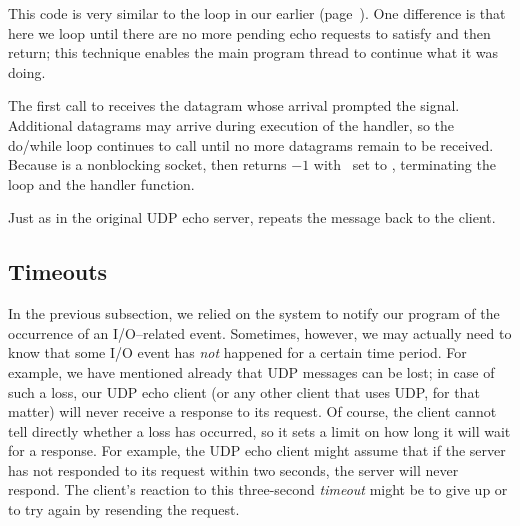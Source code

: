\begin{topcode}



This code is very similar to the loop in our earlier
 (page~\pageref{code/UDPEchoServer.c}).  One difference
is that here we loop
until there are no more pending echo requests to satisfy and then
return; this technique enables the main program thread to continue what it was
doing. 

\begin{bottomcode}


The first call to  receives the datagram
whose arrival
prompted the  signal.  Additional datagrams
may arrive during execution of the handler,
so the do/while loop continues to call 
until no more datagrams remain to be received.
Because  is a nonblocking socket,
 then returns $-1$ with \ set to
, terminating the loop and the handler
function.


Just as in the original UDP echo server, 
repeats the message back to the client.

\end{bottomcode}

\end{topcode}

\subsection{Timeouts}
\label{sect:timeouts}%

\noindent In the previous subsection, we relied on the system to notify our
program of the occurrence of an I/O--related event.
Sometimes, however, we may actually need to know that some I/O event
has \emph{not} happened  for a certain time period.
For example, we have mentioned already that UDP messages can be lost;
in case of such a loss, our UDP echo client (or any other
client that uses UDP, for that matter) will never receive a
response to its request.
Of course, the client
cannot tell directly whether a loss has occurred, so it sets
a limit on how long it will wait for a response.
For example, the UDP echo client might assume that if the server has
not responded to its request within two seconds, the server will
never respond.  The client's reaction to this three-second \emph{timeout}
might be to give up or to try again by resending the request.

